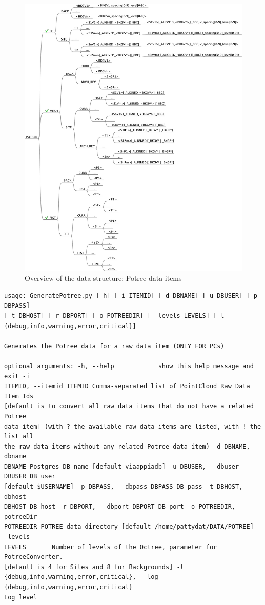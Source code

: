 \begin{figure}[] \centering
\includegraphics[width=1\textwidth]{fig/data_structure/directory_structure_potree}
\caption{Overview of the data structure: Potree data items}
\label{fig:directory_structure_overview_potree} \end{figure}

\begin{Verbatim}[fontfamily=courier,commandchars=\\\{\},fontsize=\footnotesize]
usage: GeneratePotree.py [-h] [-i ITEMID] [-d DBNAME] [-u DBUSER] [-p DBPASS]
[-t DBHOST] [-r DBPORT] [-o POTREEDIR] [--levels LEVELS] [-l
{debug,info,warning,error,critical}]

Generates the Potree data for a raw data item (ONLY FOR PCs)

optional arguments: -h, --help            show this help message and exit -i
ITEMID, --itemid ITEMID Comma-separated list of PointCloud Raw Data Item Ids
[default is to convert all raw data items that do not have a related Potree
data item] (with ? the available raw data items are listed, with ! the list all
the raw data items without any related Potree data item) -d DBNAME, --dbname
DBNAME Postgres DB name [default viaappiadb] -u DBUSER, --dbuser DBUSER DB user
[default $USERNAME] -p DBPASS, --dbpass DBPASS DB pass -t DBHOST, --dbhost
DBHOST DB host -r DBPORT, --dbport DBPORT DB port -o POTREEDIR, --potreeDir
POTREEDIR POTREE data directory [default /home/pattydat/DATA/POTREE] --levels
LEVELS       Number of levels of the Octree, parameter for PotreeConverter.
[default is 4 for Sites and 8 for Backgrounds] -l
{debug,info,warning,error,critical}, --log {debug,info,warning,error,critical}
Log level \end{Verbatim}
